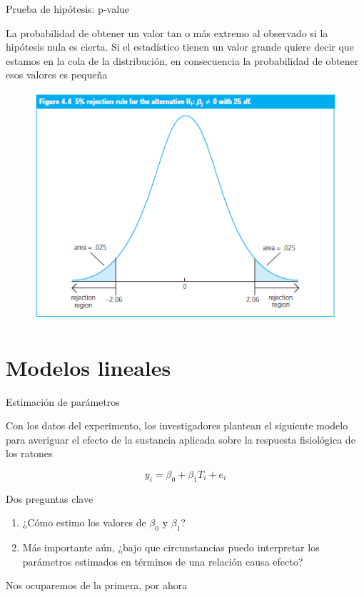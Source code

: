 \documentclass{beamer}
\begin{document}
\begin{frame}{Prueba de hipótesis: p-value}

La probabilidad de obtener un valor tan o más extremo al observado si la hipótesis nula es cierta. Si el estadístico tienen un valor grande quiere decir que estamos en la cola de la distribución, en consecuencia la probabilidad de obtener esos valores es pequeña
\begin{figure}
\centering
        \includegraphics[scale=0.5]{twotailed.PNG}
        
        \end{figure}

    
\end{frame}

\section{Modelos lineales}

\begin{frame}{Estimación de parámetros}

Con los datos del experimento, los investigadores plantean el siguiente modelo para averiguar el efecto de la sustancia aplicada sobre la respuesta fisiológica de los ratones

\begin{equation*}
    y_i=\beta_0+\beta_1 T_i+e_i
\end{equation*}

Dos preguntas clave

\begin{enumerate}
    \item ¿Cómo estimo los valores de $\beta_0$ y $\beta_1$?
    \item Más importante aún, ¿bajo que circunstancias puedo interpretar los parámetros estimados en términos de una relación causa efecto?
\end{enumerate}

Nos ocuparemos de la primera, por ahora
   
\end{frame}
\end{document}
